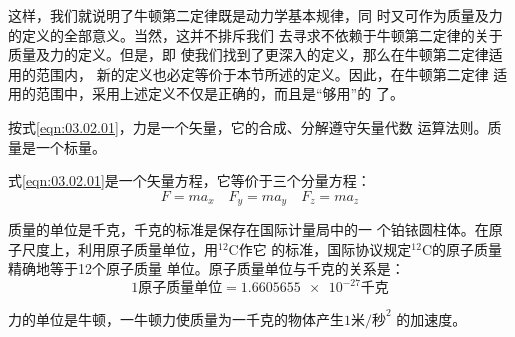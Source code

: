 { 这样，我们就说明了牛顿第二定律既是动力学基本规律，同
时又可作为质量及力的定义的全部意义。当然，这并不排斥我们
去寻求不依赖于牛顿第二定律的关于质量及力的定义。但是，即
使我们找到了更深入的定义，那么在牛顿第二定律适用的范围内，
新的定义也必定等价于本节所述的定义。因此，在牛顿第二定律
适用的范围中，采用上述定义不仅是正确的，而且是“够用”的
了。}

按式\eqref{eqn:03.02.01}，力是一个矢量，它的合成、分解遵守矢量代数
运算法则。质量是一个标量。

式\eqref{eqn:03.02.01}是一个矢量方程，它等价于三个分量方程：
\begin{equation*}
    F = m a _ { x } \quad F _ { y } = m a _ {y} \quad F _ { z } = m a_ { z }
\end{equation*}

质量的单位是千克，千克的标准是保存在国际计量局中的一
个铂铱圆柱体。在原子尺度上，利用原子质量单位，用$^{12}$C作它
的标准，国际协议规定$^{12}$C的原子质量精确地等于12个原子质量
单位。原子质量单位与千克的关系是：
\begin{equation*}
    1\text{原子质量单位} = \num{1.6605655e-27}\text{千克}
\end{equation*}

力的单位是牛顿，一牛顿力使质量为一千克的物体产生$1\text{米/秒}^2$
的加速度。